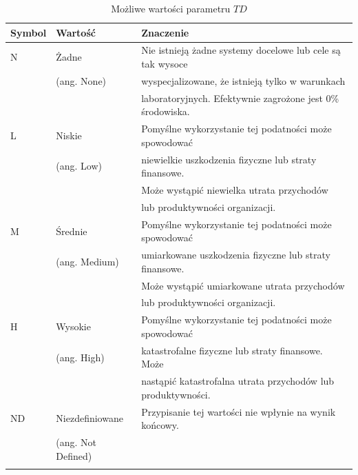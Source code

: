 \begin{table}[tbh]
\caption{Możliwe wartości parametru $TD$}
\begin{center}
\label{tab:chapter2:td}
\begin{tabular}{lll}
\hline \noalign {\smallskip}
\textbf{Symbol} & \textbf{Wartość} & \textbf{Znaczenie}    \\
\hline \noalign {\smallskip}
N & Żadne & Nie istnieją żadne systemy docelowe lub cele są tak wysoce      \\
  & (ang. None) & wyspecjalizowane, że istnieją tylko w warunkach \\
  &             & laboratoryjnych. Efektywnie zagrożone jest 0\% środowiska. \\
\hline \noalign {\smallskip}
L & Niskie     & Pomyślne wykorzystanie tej podatności może spowodować \\
  & (ang. Low) & niewielkie uszkodzenia fizyczne lub straty finansowe. \\  
  &            &  Może wystąpić niewielka utrata przychodów  \\
  &            & lub produktywności organizacji. \\
\hline \noalign {\smallskip}
M & Średnie    & Pomyślne wykorzystanie tej podatności może spowodować \\       
& (ang. Medium)& umiarkowane uszkodzenia fizyczne lub straty finansowe.\\
  &           & Może wystąpić umiarkowane utrata przychodów \\
  &           & lub produktywności organizacji.\\
\hline \noalign {\smallskip}
H & Wysokie    & Pomyślne wykorzystanie tej podatności może spowodować \\
  & (ang. High)& katastrofalne fizyczne lub straty finansowe. Może \\ 
  &            & nastąpić katastrofalna utrata przychodów lub produktywności. \\
\hline \noalign {\smallskip}
ND&Niezdefiniowane& Przypisanie tej wartości nie wpłynie na wynik końcowy. \\
  &(ang. Not Defined) & \\
\hline \noalign {\smallskip}
\end{tabular}
\end{center}
\end{table}


